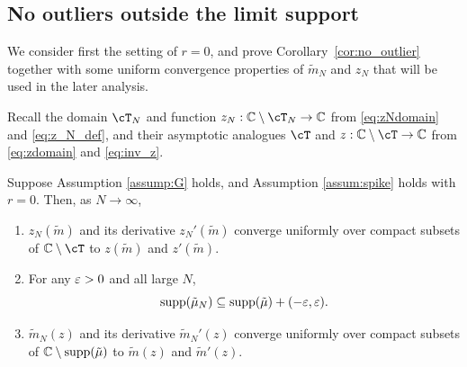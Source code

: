 \subsection{No outliers outside the limit support}

We consider first the setting of $r=0$, and prove Corollary~\ref{cor:no_outlier}
together with some uniform convergence properties of
$\tilde m_N$ and $z_N$ that will be used in the later analysis.

Recall the domain $\cT_N$ and function $z_N:\C \setminus \cT_N \to \C$ from
\eqref{eq:zNdomain} and \eqref{eq:z_N_def}, and their asymptotic
analogues $\cT$ and $z:\C
\setminus \cT \to \C$ from \eqref{eq:zdomain} and \eqref{eq:inv_z}.

\begin{lemma}\label{lemma:supportcompareb}
Suppose Assumption \ref{assump:G} holds, and Assumption \ref{assum:spike} holds
with $r=0$. Then, as $N \to \infty$,
\begin{enumerate}[label=(\alph*)]
\item $z_N(\tilde m)$ and its derivative $z_N'(\tilde m)$ converge uniformly
over compact subsets of $\C \setminus \cT$ to $z(\tilde m)$ and $z'(\tilde m)$.
\item For any $\varepsilon>0$ and all large $N$,
\[\mathrm{supp}({\tilde \mu_N}) \subseteq \mathrm{supp}({\tilde \mu})+(-\varepsilon,\varepsilon).\]
\item $\tilde m_N(z)$ and its derivative $\tilde m_N'(z)$ converge uniformly
over compact subsets of $\mathbb{C} \setminus \mathrm{supp}({\tilde \mu})$ to $\tilde m(z)$ and
$\tilde m'(z)$.
\end{enumerate}
\end{lemma}
